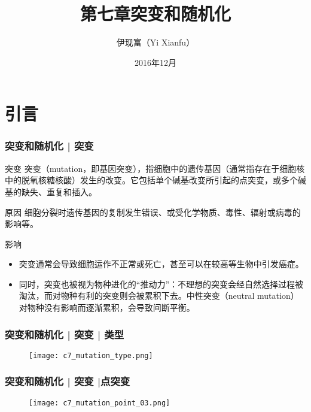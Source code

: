 


\title[突变和随机化]{第七章\quad 突变和随机化}
\author[Yixf]{伊现富（Yi Xianfu）}
\date{2016年12月}





\section{引言}
\begin{frame}
  \frametitle{突变和随机化 | 突变}
  \begin{block}{突变}
 突变（mutation，即基因突变），指细胞中的遗传基因（通常指存在于细胞核中的脱氧核糖核酸）发生的改变。它包括单个碱基改变所引起的点突变，或多个碱基的缺失、重复和插入。
  \end{block}
  \pause
  \begin{block}{原因}
    细胞分裂时遗传基因的复制发生错误、或受化学物质、毒性、辐射或病毒的影响等。
  \end{block}
  \pause
  \begin{block}{影响}
    \begin{itemize}
      \item 突变通常会导致细胞运作不正常或死亡，甚至可以在较高等生物中引发癌症。
      \item 同时，突变也被视为物种进化的“推动力”：不理想的突变会经自然选择过程被淘汰，而对物种有利的突变则会被累积下去。中性突变（neutral mutation）对物种没有影响而逐渐累积，会导致间断平衡。
    \end{itemize}
  \end{block}
\end{frame}

\begin{frame}
  \frametitle{突变和随机化 | 突变 | 类型}
  \begin{figure}
    \centering
    \texttt{[image: c7\_mutation\_type.png]}
  \end{figure}
\end{frame}

\begin{frame}
  \frametitle{突变和随机化 | 突变 |点突变}
  \begin{figure}
    \centering
    \texttt{[image: c7\_mutation\_point\_03.png]}
  \end{figure}
\end{frame}

